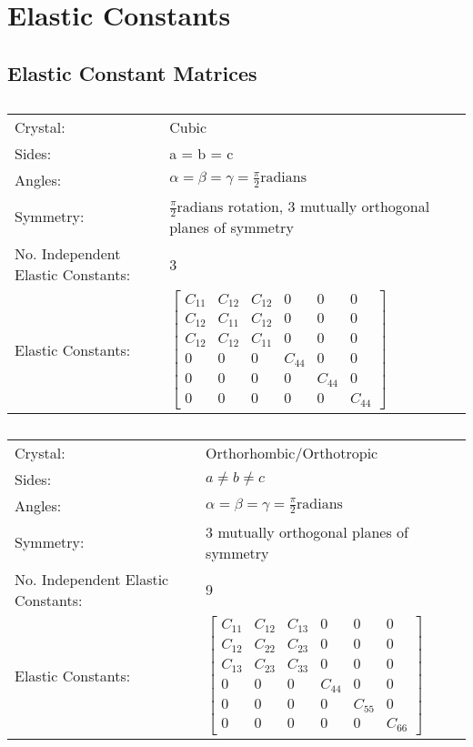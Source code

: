 \chapter{Elastic Constants}
\label{section:elasticconstantsappendix}


\section{Elastic Constant Matrices}

\renewcommand{\arraystretch}{1.7}
\begin{table}[!htbp]
\begin{tabular}{ll}
Crystal: & Cubic \\
Sides: & a = b = c \\
Angles: & $\alpha = \beta = \gamma = \frac{\pi}{2} \text{radians}$ \\
Symmetry: & $\frac{\pi}{2} \text{radians}$ rotation, 3 mutually orthogonal planes of symmetry \\
No. Independent Elastic Constants: & 3  \\
Elastic Constants: & $ \begin{bmatrix} C_{11} & C_{12} & C_{12} & 0 & 0 & 0 \\ C_{12} & C_{11} & C_{12} & 0 & 0 & 0 \\ C_{12} & C_{12} & C_{11} & 0 & 0 & 0 \\ 0 & 0 & 0 & C_{44} & 0 & 0 \\ 0 & 0 & 0 & 0 & C_{44} & 0 \\ 0 & 0 & 0 & 0 & 0 & C_{44} \end{bmatrix} $ \\
\end{tabular}
\label{tab:elasticcubic}
\caption{}
\end{table}


\renewcommand{\arraystretch}{1.7}
\begin{table}[!htbp]
\begin{tabular}{ll}
Crystal: & Orthorhombic/Orthotropic \\
Sides: & $a \ne b \ne c$ \\
Angles: & $\alpha = \beta = \gamma = \frac{\pi}{2} \text{radians}$ \\
Symmetry: & 3 mutually orthogonal planes of symmetry \\
No. Independent Elastic Constants: & 9  \\
Elastic Constants: & $\begin{bmatrix} C_{11} & C_{12} & C_{13} & 0 & 0 & 0 \\ C_{12} & C_{22} & C_{23} & 0 & 0 & 0 \\ C_{13} & C_{23} & C_{33} & 0 & 0 & 0 \\ 0 & 0 & 0 & C_{44} & 0 & 0 \\ 0 & 0 & 0 & 0 & C_{55} & 0 \\ 0 & 0 & 0 & 0 & 0 & C_{66} \end{bmatrix} $ \\
\end{tabular}
\label{tab:elasticorthorhombic}
\caption{}
\end{table}


